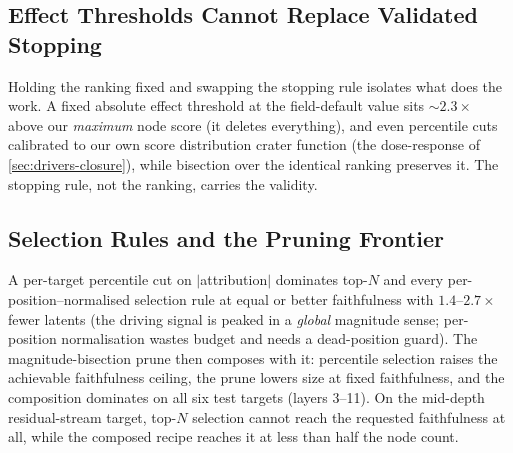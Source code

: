 \documentclass[10pt]{article}
\begin{document}
\subsection{Effect Thresholds Cannot Replace Validated Stopping}
Holding the ranking fixed and swapping the stopping rule isolates what does the work.
A fixed absolute effect threshold at the field-default value sits ${\sim}2.3\times$ above our \emph{maximum} node score (it deletes everything), and even percentile cuts calibrated to our own score distribution crater function (the dose-response of \cref{sec:drivers-closure}), while bisection over the identical ranking preserves it.
The stopping rule, not the ranking, carries the validity.

\subsection{Selection Rules and the Pruning Frontier}
A per-target percentile cut on $|$attribution$|$ dominates top-$N$ and every per-position--normalised selection rule at equal or better faithfulness with $1.4$--$2.7\times$ fewer latents (the driving signal is peaked in a \emph{global} magnitude sense; per-position normalisation wastes budget and needs a dead-position guard).
The magnitude-bisection prune then composes with it: percentile selection raises the achievable faithfulness ceiling, the prune lowers size at fixed faithfulness, and the composition dominates on all six test targets (layers 3--11).
On the mid-depth residual-stream target, top-$N$ selection cannot reach the requested faithfulness at all, while the composed recipe reaches it at less than half the node count.
\end{document}
